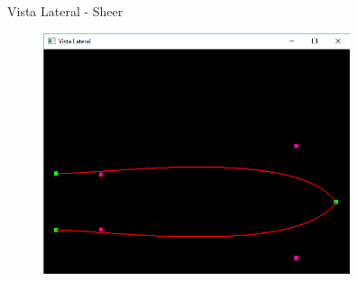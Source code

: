 \documentclass{beamer}
\begin{document}
\begin{frame}{Vista Lateral - Sheer}
\begin{figure}[h]	
\centering
\includegraphics[width=9cm]{linhasheerplan}
\end{figure}
\end{frame}
\end{document}
